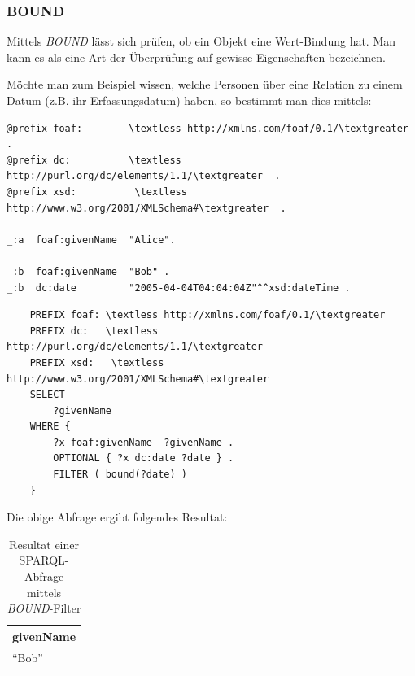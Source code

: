 \subsubsection{BOUND}
\label{subsec:sparql_ausdruecke_funktionen_bound}
Mittels \textit{BOUND} lässt sich prüfen, ob ein Objekt eine Wert-Bindung hat. Man kann es als eine Art der Überprüfung auf gewisse Eigenschaften bezeichnen.

Möchte man zum Beispiel wissen, welche Personen über eine Relation zu einem Datum (z.B. ihr Erfassungsdatum) haben, so bestimmt man dies mittels:
\begin{lstlisting}
@prefix foaf:        \textless http://xmlns.com/foaf/0.1/\textgreater  .
@prefix dc:          \textless http://purl.org/dc/elements/1.1/\textgreater  .
@prefix xsd:          \textless http://www.w3.org/2001/XMLSchema#\textgreater  .

_:a  foaf:givenName  "Alice".

_:b  foaf:givenName  "Bob" .
_:b  dc:date         "2005-04-04T04:04:04Z"^^xsd:dateTime .
\end{lstlisting}

\begin{lstlisting}
    PREFIX foaf: \textless http://xmlns.com/foaf/0.1/\textgreater 
    PREFIX dc:   \textless http://purl.org/dc/elements/1.1/\textgreater 
    PREFIX xsd:   \textless http://www.w3.org/2001/XMLSchema#\textgreater 
    SELECT
        ?givenName
    WHERE {
        ?x foaf:givenName  ?givenName .
        OPTIONAL { ?x dc:date ?date } .
        FILTER ( bound(?date) )
    }
\end{lstlisting}

Die obige Abfrage ergibt folgendes Resultat:
\noindent\hspace*{15mm}
\begin{table}[h]
    \centering
    \begin{tabular}{|l|}
        \hline
        \multicolumn{1}{|c|}{\textbf{givenName}} \\ \hline
        ``Bob''                    \\ \hline
    \end{tabular}
    \caption{Resultat einer SPARQL-Abfrage mittels \textit{BOUND}-Filter\protect\footnotemark}
\end{table}

